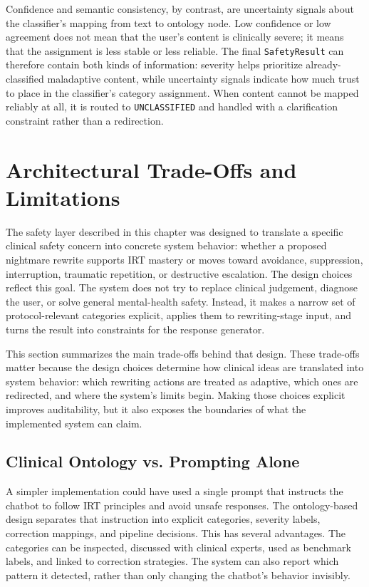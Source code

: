 Confidence and semantic consistency, by contrast, are uncertainty signals about the
classifier's mapping from text to ontology node. Low confidence or low agreement does
not mean that the user's content is clinically severe; it means that the assignment is
less stable or less reliable. The final \texttt{SafetyResult} can therefore contain both
kinds of information: severity helps prioritize already-classified maladaptive content,
while uncertainty signals indicate how much trust to place in the classifier's category
assignment. When content cannot be mapped reliably at all, it is routed to
\texttt{UNCLASSIFIED} and handled with a clarification constraint rather than a
redirection.

\section{Architectural Trade-Offs and Limitations}

The safety layer described in this chapter was designed to translate a specific clinical
safety concern into concrete system behavior: whether a proposed nightmare rewrite
supports IRT mastery or moves toward avoidance, suppression, interruption, traumatic
repetition, or destructive escalation. The design choices reflect this goal. The system
does not try to replace clinical judgement, diagnose the user, or solve general
mental-health safety. Instead, it makes a narrow set of protocol-relevant categories
explicit, applies them to rewriting-stage input, and turns the result into constraints
for the response generator.

This section summarizes the main trade-offs behind that design. These trade-offs matter
because the design choices determine how clinical ideas are translated into system
behavior: which rewriting actions are treated as adaptive, which ones are redirected,
and where the system's limits begin. Making those choices explicit improves auditability,
but it also exposes the boundaries of what the implemented system can claim.

\subsection{Clinical Ontology vs. Prompting Alone}

A simpler implementation could have used a single prompt that instructs the chatbot to
follow IRT principles and avoid unsafe responses. The ontology-based design separates
that instruction into explicit categories, severity labels, correction mappings, and
pipeline decisions. This has several advantages. The categories can be inspected,
discussed with clinical experts, used as benchmark labels, and linked to correction
strategies. The system can also report which pattern it detected, rather than only
changing the chatbot's behavior invisibly.

